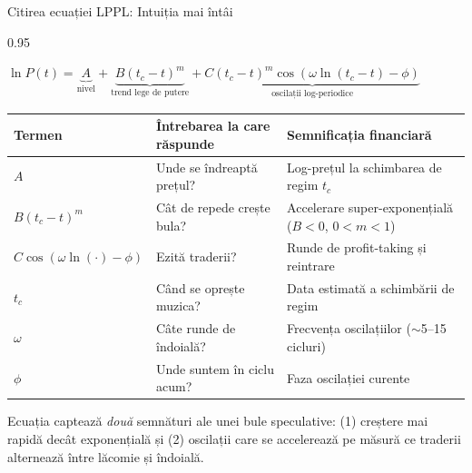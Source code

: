 \documentclass[9pt, aspectratio=169, t]{beamer}
\begin{document}
\begin{frame}{Citirea ecuației LPPL: Intuiția mai întâi}
    \begin{cminipage}{0.95\textwidth}
    {\footnotesize
    \begin{center}
        $\ln P(t) = \underbrace{A}_{\text{nivel}} + \underbrace{B(t_c - t)^m}_{\text{trend lege de putere}} + \underbrace{C(t_c - t)^m \cos(\omega \ln(t_c - t) - \phi)}_{\text{oscilații log-periodice}}$
    \end{center}
    \vspace{2mm}
    \renewcommand{\arraystretch}{1.5}
    \begin{tabular}{>{\centering\arraybackslash}p{2.5cm} p{4.2cm} p{4.5cm}}
        \toprule
        \textbf{Termen} & \textbf{Întrebarea la care răspunde} & \textbf{Semnificația financiară} \\
        \midrule
        $A$ & Unde se îndreaptă prețul? & Log-prețul la schimbarea de regim $t_c$ \\
        $B(t_c - t)^m$ & Cât de repede crește bula? & Accelerare super-exponențială ($B < 0$, $0 < m < 1$) \\
        $C\cos(\omega\ln(\cdot) - \phi)$ & Ezită traderii? & Runde de profit-taking și reintrare \\
        $t_c$ & Când se oprește muzica? & Data estimată a schimbării de regim \\
        $\omega$ & Câte runde de îndoială? & Frecvența oscilațiilor ($\sim$5--15 cicluri) \\
        $\phi$ & Unde suntem în ciclu acum? & Faza oscilației curente \\
        \bottomrule
    \end{tabular}
    }
    \vspace{2mm}
    {\scriptsize\textcolor{MediumGray}{Ecuația captează \textit{două} semnături ale unei bule speculative: (1) creștere mai rapidă decât exponențială și (2) oscilații care se accelerează pe măsură ce traderii alternează între lăcomie și îndoială.}}
    \end{cminipage}
\end{frame}
\end{document}

